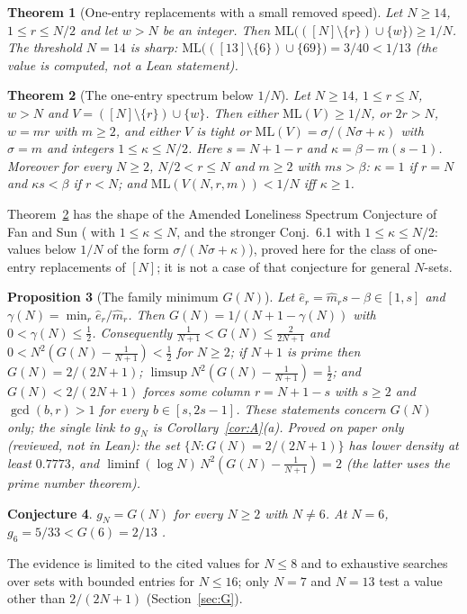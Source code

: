 \documentclass[11pt]{article}
\newtheorem{theorem}{Theorem}[section]
\newtheorem{proposition}[theorem]{Proposition}
\newtheorem{conjecture}[theorem]{Conjecture}
\theoremstyle{definition}
\theoremstyle{remark}
\newcommand{\ML}{\mathrm{ML}}
\begin{document}
\begin{theorem}[One-entry replacements with a small removed speed]\label{thm:OE}
Let $N\ge14$, $1\le r\le N/2$ and let $w>N$ be an integer. Then $\ML\bigl(([N]\setminus\{r\})\cup\{w\}\bigr)\ge1/N$. The threshold $N=14$ is sharp: $\ML\bigl(([13]\setminus\{6\})\cup\{69\}\bigr)=3/40<1/13$ (the value is computed, not a Lean statement).
\end{theorem}

\begin{theorem}[The one-entry spectrum below $1/N$]\label{thm:FS}
Let $N\ge14$, $1\le r\le N$, $w>N$ and $V=([N]\setminus\{r\})\cup\{w\}$. Then either $\ML(V)\ge1/N$, or $2r>N$, $w=mr$ with $m\ge2$, and either $V$ is tight or $\ML(V)=\sigma/(N\sigma+\kappa)$ with $\sigma=m$ and integers $1\le\kappa\le N/2$. Here $s=N+1-r$ and $\kappa=\beta-m(s-1)$. Moreover for every $N\ge2$, $N/2<r\le N$ and $m\ge2$ with $ms>\beta$: $\kappa=1$ if $r=N$ and $\kappa s<\beta$ if $r<N$; and $\ML(V(N,r,m))<1/N$ iff $\kappa\ge1$.
\end{theorem}
Theorem~\ref{thm:FS} has the shape of the Amended Loneliness Spectrum Conjecture of Fan and Sun (\cite[Conj.~1.3]{FS} with $1\le\kappa\le N$, and the stronger Conj.~6.1 with $1\le\kappa\le N/2$: values below $1/N$ of the form $\sigma/(N\sigma+\kappa)$), proved here for the class of one-entry replacements of $[N]$; it is not a case of that conjecture for general $N$-sets.

\begin{proposition}[The family minimum $G(N)$]\label{prop:G}
Let $\hat e_r=\hat m_rs-\beta\in[1,s]$ and $\gamma(N)=\min_r\hat e_r/\hat m_r$. Then $G(N)=1/(N+1-\gamma(N))$ with $0<\gamma(N)\le\tfrac12$. Consequently $\frac1{N+1}<G(N)\le\frac2{2N+1}$ and $0<N^2(G(N)-\frac1{N+1})<\frac12$ for $N\ge2$; if $N+1$ is prime then $G(N)=2/(2N+1)$; $\limsup N^2(G(N)-\frac1{N+1})=\frac12$; and $G(N)<2/(2N+1)$ forces some column $r=N+1-s$ with $s\ge2$ and $\gcd(b,r)>1$ for every $b\in[s,2s-1]$. These statements concern $G(N)$ only; the single link to $g_N$ is Corollary~\ref{cor:A}(a). Proved on paper only (reviewed, not in Lean): the set $\{N:G(N)=2/(2N+1)\}$ has lower density at least $0.7773$, and $\liminf(\log N)\,N^2(G(N)-\frac1{N+1})=2$ (the latter uses the prime number theorem).
\end{proposition}

\begin{conjecture}\label{conj:gap}
$g_N=G(N)$ for every $N\ge2$ with $N\ne6$. At $N=6$, $g_6=5/33<G(6)=2/13$ \cite{C}.
\end{conjecture}
The evidence is limited to the cited values for $N\le8$ and to exhaustive searches over sets with bounded entries for $N\le16$; only $N=7$ and $N=13$ test a value other than $2/(2N+1)$ (Section~\ref{sec:G}).
\end{document}
